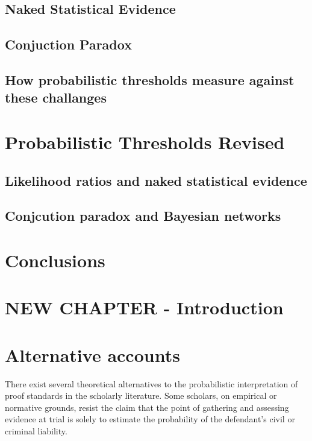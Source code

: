 \documentclass[10pt,dvipsnames]{scrartcl}
\begin{document}
\subsection{Naked Statistical
Evidence}\label{naked-statistical-evidence}

\subsection{Conjuction Paradox}\label{conjuction-paradox}

\subsection{How probabilistic thresholds measure against these
challanges}\label{how-probabilistic-thresholds-measure-against-these-challanges}

\section{Probabilistic Thresholds
Revised}\label{probabilistic-thresholds-revised}

\subsection{Likelihood ratios and naked statistical
evidence}\label{likelihood-ratios-and-naked-statistical-evidence}

\subsection{Conjcution paradox and Bayesian
networks}\label{conjcution-paradox-and-bayesian-networks}

\section{Conclusions}\label{conclusions}

\section{NEW CHAPTER - Introduction}\label{new-chapter---introduction}

\section{Alternative accounts}\label{alternative-accounts}

There exist several theoretical alternatives to the probabilistic
interpretation of proof standards in the scholarly literature. Some
scholars, on empirical or normative grounds, resist the claim that the
point of gathering and assessing evidence at trial is solely to estimate
the probability of the defendant's civil or criminal liability.
\end{document}
